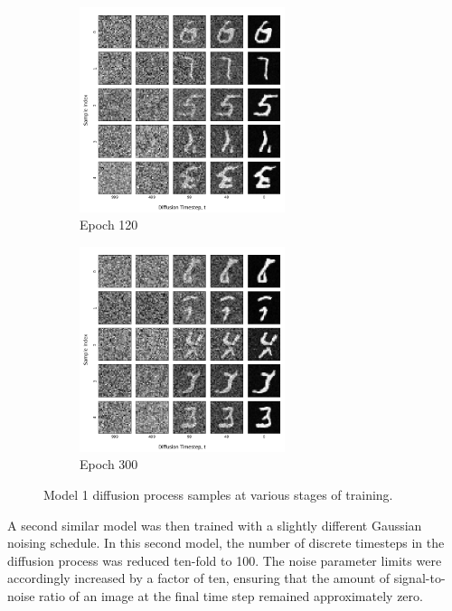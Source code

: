 \documentclass[12pt]{article}
\begin{document}
\begin{figure}[hp]
    \begin{subfigure}{0.49\textwidth}
    \includegraphics[width=0.9\linewidth, height=6cm]{figures/diffusion_plot_1_0120.png}
    \caption{Epoch 120}
    \label{fig:1_120}
    \end{subfigure}
    \begin{subfigure}{0.49\textwidth}
    \includegraphics[width=0.9\linewidth, height=6cm]{figures/diffusion_plot_1_0300.png}
    \caption{Epoch 300}
    \label{fig:1_300}
    \end{subfigure}

    \caption{Model 1 diffusion process samples at various stages of training.}
    \label{fig:diffusion_1}
\end{figure}

A second similar model was then trained with a slightly different Gaussian noising schedule.
In this second model, the number of discrete timesteps in the diffusion process was reduced ten-fold to 100.
The noise parameter limits were accordingly increased by a factor of ten, ensuring that the amount of signal-to-noise ratio of an image at the final time step remained approximately zero.
\end{document}
